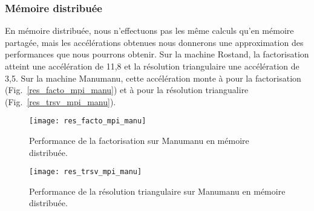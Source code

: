 \subsubsection{Mémoire distribuée}
En mémoire distribuée, nous n'effectuons pas les même calculs qu'en mémoire partagée, mais les accélérations obtenues nous donnerons une approximation des performances que nous pourrons obtenir.
%
Sur la machine Rostand, la factorisation atteint une accélération de 11,8 et la résolution triangulaire une accélération de 3,5.
%
Sur la machine Manumanu, cette accélération monte à pour la factorisation (Fig.~\ref{res_facto_mpi_manu}) et à pour la résolution triangualire (Fig.~\ref{res_trsv_mpi_manu}).


\begin{figure}[t!]
  \centering
  \texttt{[image: res\_facto\_mpi\_manu]}
  \caption{Performance de la factorisation sur Manumanu en mémoire distribuée.}
  \label{fig:res_facto_mpi_manumanu}
\end{figure}


\begin{figure}[t!]
  \centering
  \texttt{[image: res\_trsv\_mpi\_manu]}
  \caption{Performance de la résolution triangulaire sur Manumanu en mémoire distribuée.}
  \label{fig:res_trsv_mpi_manumanu}
\end{figure}
